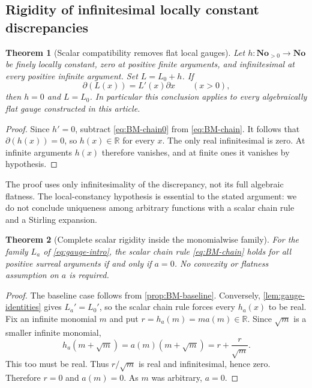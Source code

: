 \documentclass[11pt,letterpaper]{article}
\numberwithin{equation}{section}
\newtheorem{theorem}{Theorem}[section]
\theoremstyle{plain}
\theoremstyle{definition}
\theoremstyle{remark}
\newcommand{\No}{\mathbf{No}}
\newcommand{\R}{\mathbb R}
\newcommand{\der}{\partial}
\begin{document}
\subsection{Rigidity of infinitesimal locally constant discrepancies}
\begin{theorem}[Scalar compatibility removes flat local gauges]
\label{thm:BM-flat}
Let $h:\No_{>0}\to\No$ be finely locally constant, zero at positive
finite arguments, and infinitesimal at every positive infinite argument.
Set $L=L_0+h$. If
\begin{equation}\label{eq:BM-chain}
 \der(L(x))=L'(x)\der x\qquad(x>0),
\end{equation}
then $h=0$ and $L=L_0$.
In particular this conclusion applies to every algebraically flat gauge
constructed in this article.
\end{theorem}
\begin{proof}
Since $h'=0$, subtract \eqref{eq:BM-chain0} from
\eqref{eq:BM-chain}. It follows that $\der(h(x))=0$, so $h(x)\in\R$
for every $x$. The only real infinitesimal is zero. At infinite arguments
$h(x)$ therefore vanishes, and at finite ones it vanishes by hypothesis.
\end{proof}

The proof uses only infinitesimality of the discrepancy, not its full
algebraic flatness. The local-constancy hypothesis is essential to the stated
argument: we do not conclude uniqueness among arbitrary functions with a
scalar chain rule and a Stirling expansion.

\begin{theorem}[Complete scalar rigidity inside the monomialwise family]
\label{thm:BM-all}
For the family $L_a$ of \eqref{eq:gauge-intro}, the scalar chain rule
\eqref{eq:BM-chain} holds for all positive surreal arguments if and only if
$a=0$. No convexity or flatness assumption on $a$ is required.
\end{theorem}
\begin{proof}
The baseline case follows from \cref{prop:BM-baseline}. Conversely,
\cref{lem:gauge-identities} gives $L_a'=L_0'$, so the scalar chain rule
forces every $h_a(x)$ to be real. Fix an infinite monomial $m$ and put
$r=h_a(m)=m a(m)\in\R$. Since $\sqrt m$ is a smaller infinite monomial,
\[
 h_a(m+\sqrt m)=a(m)(m+\sqrt m)=r+\frac r{\sqrt m}.
\]
This too must be real. Thus $r/\sqrt m$ is real and infinitesimal, hence
zero. Therefore $r=0$ and $a(m)=0$. As $m$ was arbitrary, $a=0$.
\end{proof}
\end{document}
